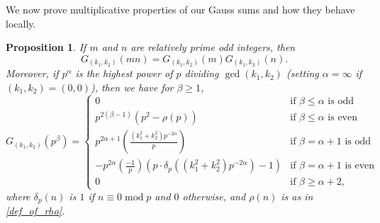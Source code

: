 \documentclass[12pt]{amsart}
\newtheorem{proposition}[theorem]{Proposition}
\def\mod{\operatorname{mod}}
\def\gcd{\operatorname{gcd}}
\begin{document}
We now prove multiplicative properties of our Gauss sums and how they behave locally.
\begin{proposition}\label{G_k(n) conditions}
If $m$ and $n$ are relatively prime odd integers, then $$G_{(k_1,k_2)}(mn)=G_{(k_1,k_2)}(m)G_{(k_1,k_2)}(n).$$ Moreover, if $p^{\alpha}$ is the highest power of $p$  dividing $\gcd(k_1,k_2)$ (setting $\alpha=\infty$ if $(k_1,k_2)=(0,0)$), then we have for $\beta\geq 1$,
$$ G_{(k_1,k_2)}(p^{\beta}) = \begin{cases}
    0 & \text{if } \beta\leq \alpha \text{ is odd} \\
    p^{2(\beta-1)} (p^2 - \rho(p)) & \text{if } \beta\leq \alpha \text{ is even} \\
    p^{2\alpha+1} \left( \frac{(k_1^2+k_2^2)p^{-2\alpha}}{p}\right) & \text{if } \beta = \alpha + 1 \text{ is odd} \\ 
    -p^{2\alpha}\left( \frac{-1}{p} \right)(p\cdot \delta_p((k_1^2+k_2^2)p^{-2\alpha}) - 1)  & \text{if } \beta=\alpha + 1 \text{ is even} \\
    0 & \text{if } \beta\geq \alpha+2,
\end{cases} $$
where $\delta_p(n)$ is $1$ if $n\equiv 0 \mod p$ and $0$ otherwise, and $\rho(n)$ is as in \eqref{def_of_rho}.
\end{proposition}
\end{document}
